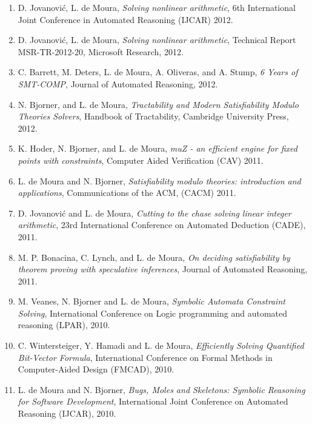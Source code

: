 \documentclass{article}
\begin{document}
\begin{enumerate}
\item D. Jovanovi\'{c}, L. de Moura,
      {\em Solving nonlinear arithmetic},
6th International Joint Conference in Automated Reasoning (IJCAR) 2012.

\item D. Jovanovi\'{c}, L. de Moura,
      {\em Solving nonlinear arithmetic},
Technical Report MSR-TR-2012-20, Microsoft Research, 2012.

\item C. Barrett, M. Deters, L. de Moura, A. Oliveras, and A. Stump,
      {\em 6 Years of SMT-COMP},
Journal of Automated Reasoning, 2012.

\item N. Bjorner, and L. de Moura,
{\em Tractability and Modern Satisfiability Modulo Theories Solvers},
Handbook of Tractability, Cambridge University Press, 2012.

\item K. Hoder, N. Bjorner, and L. de Moura,
      {\em muZ - an efficient engine for fixed points with constraints},
Computer Aided Verification (CAV) 2011.

\item L. de Moura and N. Bjorner,
      {\em Satisfiability modulo theories: introduction and applications},
Communications of the ACM, (CACM) 2011.

\item D. Jovanovi\'{c} and L. de Moura,
      {\em Cutting to the chase solving linear integer arithmetic},
23rd International Conference on Automated Deduction (CADE), 2011.

\item M. P. Bonacina, C. Lynch, and L. de Moura,
      {\em On deciding satisfiability by theorem proving with speculative inferences},
Journal of Automated Reasoning, 2011.

\item M. Veanes, N. Bjorner and L. de Moura,
{\em Symbolic Automata Constraint Solving},
International Conference on Logic programming and automated reasoning (LPAR), 2010.

\item C. Wintersteiger, Y. Hamadi and L. de Moura,
{\em Efficiently Solving Quantified Bit-Vector Formula},
International Conference on Formal Methods in Computer-Aided Design (FMCAD), 2010.

\item L. de Moura and N. Bjorner,
{\em Bugs, Moles and Skeletons: Symbolic Reasoning for Software Development},
International Joint Conference on Automated Reasoning (IJCAR), 2010.


\end{enumerate}
\end{document}
